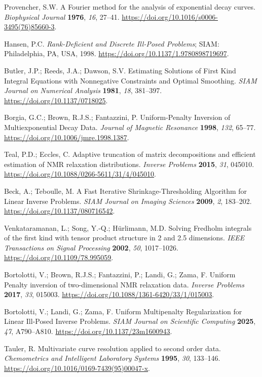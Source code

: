 Provencher, S.W. A Fourier method for the analysis of exponential decay curves. \emph{Biophysical Journal} \textbf{1976}, \emph{16}, 27--41. \url{https://doi.org/10.1016/s0006-3495(76)85660-3}.

Hansen, P.C. \emph{Rank-Deficient and Discrete Ill-Posed Problems}; SIAM: Philadelphia, PA, USA, 1998. \url{https://doi.org/10.1137/1.9780898719697}.

Butler, J.P.; Reeds, J.A.; Dawson, S.V. Estimating Solutions of First Kind Integral Equations with Nonnegative Constraints and Optimal Smoothing. \emph{SIAM Journal on Numerical Analysis} \textbf{1981}, \emph{18}, 381--397. \url{https://doi.org/10.1137/0718025}.

Borgia, G.C.; Brown, R.J.S.; Fantazzini, P. Uniform-Penalty Inversion of Multiexponential Decay Data. \emph{Journal of Magnetic Resonance} \textbf{1998}, \emph{132}, 65--77. \url{https://doi.org/10.1006/jmre.1998.1387}.

Teal, P.D.; Eccles, C. Adaptive truncation of matrix decompositions and efficient estimation of NMR relaxation distributions. \emph{Inverse Problems} \textbf{2015}, \emph{31}, 045010. \url{https://doi.org/10.1088/0266-5611/31/4/045010}.

Beck, A.; Teboulle, M. A Fast Iterative Shrinkage-Thresholding Algorithm for Linear Inverse Problems. \emph{SIAM Journal on Imaging Sciences} \textbf{2009}, \emph{2}, 183--202. \url{https://doi.org/10.1137/080716542}.

Venkataramanan, L.; Song, Y.-Q.; Hürlimann, M.D. Solving Fredholm integrals of the first kind with tensor product structure in 2 and 2.5 dimensions. \emph{IEEE Transactions on Signal Processing} \textbf{2002}, \emph{50}, 1017--1026. \url{https://doi.org/10.1109/78.995059}.

Bortolotti, V.; Brown, R.J.S.; Fantazzini, P.; Landi, G.; Zama, F. Uniform Penalty inversion of two-dimensional NMR relaxation data. \emph{Inverse Problems} \textbf{2017}, \emph{33}, 015003. \url{https://doi.org/10.1088/1361-6420/33/1/015003}.

Bortolotti, V.; Landi, G.; Zama, F. Uniform Multipenalty Regularization for Linear Ill-Posed Inverse Problems. \emph{SIAM Journal on Scientific Computing} \textbf{2025}, \emph{47}, A790--A810. \url{https://doi.org/10.1137/23m1600943}.

Tauler, R. Multivariate curve resolution applied to second order data. \emph{Chemometrics and Intelligent Laboratory Systems} \textbf{1995}, \emph{30}, 133--146. \url{https://doi.org/10.1016/0169-7439(95)00047-x}.

